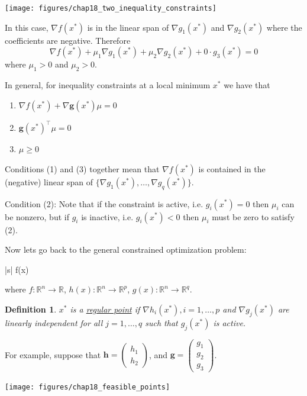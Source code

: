 \documentclass{article}
\newtheorem{definition}[theorem]{Definition}
\newcommand{\gbf}{\mathbf{g}}
\newcommand{\hbf}{\mathbf{h}}
\begin{document}
\par{}
		
	\begin{center}
		\texttt{[image: figures/chap18\_two\_inequality\_constraints]}
	\end{center}
	In this case, $\nabla f(x^{\ast})$ is in the linear span of $\nabla g_1(x^{\ast})$ and $\nabla g_2(x^{\ast})$ where the coefficients are negative.  Therefore
	\[ 
		\nabla f(x^{\ast}) 
			+ \mu_1 \nabla g_1(x^{\ast}) 
			+ \mu_2 \nabla g_2 (x^{\ast}) 
			+ 0\cdot g_3 (x^{\ast}) = 0 
	\]
	where $\mu_1 > 0$ and $\mu_2 > 0$.


	In general, for inequality constraints at a local minimum $x^{\ast}$ we have that
	\begin{enumerate}
	\item $\nabla f(x^{\ast}) + \nabla \gbf(x^{\ast})\mu = 0$
	\item $\gbf(x^{\ast})^\top  \mu = 0$
	\item $\mu \geq 0$
	\end{enumerate}
	
	Conditions (1) and (3) together mean that $\nabla f(x^{\ast})$ is contained in the (negative) linear span of $\{\nabla g_1(x^{\ast}),\ldots,\nabla g_{q}(x^{\ast}) \}$.
	
	
	Condition (2): Note that if the constraint is active, i.e. $g_i(x^{\ast}) = 0$ then $\mu_i$ can be nonzero, but if $g_i$ is inactive, i.e. $g_i(x^{\ast}) < 0$ then $\mu_i$ must be zero to satisfy (2).		


	Now lets go back to the general constrained optimization problem:
	\begin{mini*}|s|
		{}{f(x)}{}{}
		\addConstraint{\hbf(x) = 0}
		\addConstraint{\gbf(x) \leq 0}
	\end{mini*}	
	where 
	$f:\mathbb{R}^n\to \mathbb{R}$,
	$h(x):\mathbb{R}^n\to\mathbb{R}^p$,
	$g(x):\mathbb{R}^n\to\mathbb{R}^q$.
	
	\begin{definition}
	$x^{\ast}$ is a \underline{regular point} if $\nabla h_i(x^{\ast}), i = 1, \ldots, p$ and $\nabla g_j(x^{\ast})$ are linearly independent for all $j=1,\dots, q$ such that $g_j(x^{\ast})$ is active.		
	\end{definition}

	For example, suppose that
	$\hbf = \begin{pmatrix}
	    	h_1\\h_2
	  	 \end{pmatrix}$, and 
	$\gbf = \begin{pmatrix}
	    	g_1\\g_2\\g_3
	  	 \end{pmatrix}$.
	\begin{center}
		\texttt{[image: figures/chap18\_feasible\_points]} 
	\end{center}
\end{document}
